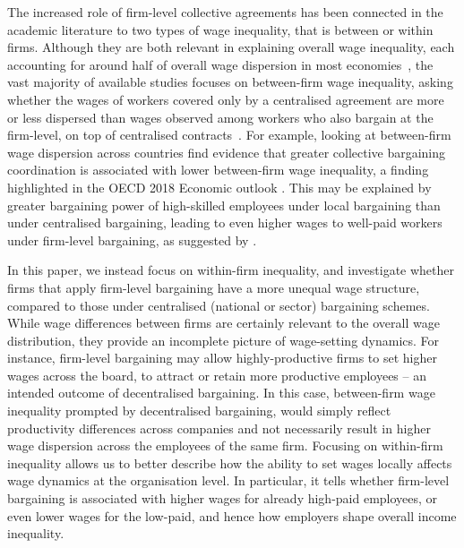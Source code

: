 \documentclass[12pt]{article}
\begin{document}
The increased role of firm-level collective agreements has been connected in the academic literature to two types of wage inequality, that is between or within firms.
Although they are both relevant in explaining overall wage inequality, each accounting for around half of overall wage dispersion in most economies~\citep{lazear.shaw.2007,fournier.koske.2013,GlobalWageReport}, the vast majority of available studies focuses on between-firm wage inequality, asking whether the wages of workers covered only by a centralised agreement are more or less dispersed than wages observed among workers who also bargain at the firm-level, on top of centralised contracts~\citep{dellaringa.lucifora.1994,hibbs.locking.1996,palenzuela.jimeno.1996,hartog.leuven.ea.2002,rycx.2003,cardoso.portugal.2005,checchi.pagani.2005,plasman.rusinek.ea.2007,card.delarica.2006,dellaringa.pagani.2007,daouli.demoussis.ea.2013}.
For example, looking at between-firm wage dispersion across countries \citet{Berlingieri2017} find evidence that greater collective bargaining coordination is associated with lower between-firm wage inequality, a finding highlighted in the OECD 2018 Economic outlook \citep{OECD2018}. This may be explained by greater bargaining power of high-skilled employees under local bargaining than under centralised bargaining, leading to even higher wages to well-paid workers under firm-level bargaining, as suggested by \cite{dahl.lemaire.ea.2013}.

In this paper, we instead focus on within-firm inequality, and investigate whether firms that apply firm-level bargaining have a more unequal wage structure, compared to those under centralised (national or sector) bargaining schemes. While wage differences between firms are certainly relevant to the overall wage distribution, they provide an incomplete picture of wage-setting dynamics. For instance, firm-level bargaining may allow highly-productive firms to set higher wages across the board, to attract or retain more productive employees -- an intended outcome of decentralised bargaining. In this case, between-firm wage inequality prompted by decentralised bargaining, would simply reflect productivity differences across companies and not necessarily result in higher wage dispersion across the employees of the same firm. Focusing on within-firm inequality allows us to better describe how the ability to set wages locally affects wage dynamics at the organisation level. In particular, it tells whether firm-level bargaining is associated with higher wages for already high-paid employees, or even lower wages for the low-paid, and hence how employers shape overall income inequality. 
\end{document}
